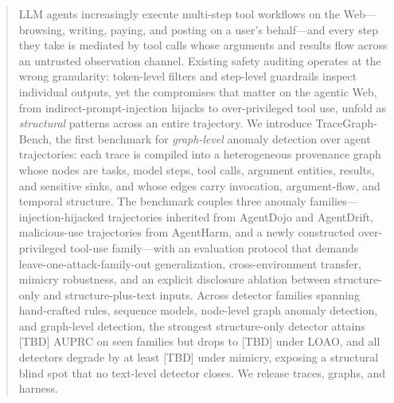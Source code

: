 \begin{abstract}
LLM agents increasingly execute multi-step tool workflows on the Web---browsing, writing, paying, and posting on a user's behalf---and every step they take is mediated by tool calls whose arguments and results flow across an untrusted observation channel. Existing safety auditing operates at the wrong granularity: token-level filters and step-level guardrails inspect individual outputs, yet the compromises that matter on the agentic Web, from indirect-prompt-injection hijacks to over-privileged tool use, unfold as \emph{structural} patterns across an entire trajectory. We introduce TraceGraph-Bench, the first benchmark for \emph{graph-level} anomaly detection over agent trajectories: each trace is compiled into a heterogeneous provenance graph whose nodes are tasks, model steps, tool calls, argument entities, results, and sensitive sinks, and whose edges carry invocation, argument-flow, and temporal structure. The benchmark couples three anomaly families---injection-hijacked trajectories inherited from AgentDojo and AgentDrift, malicious-use trajectories from AgentHarm, and a newly constructed over-privileged tool-use family---with an evaluation protocol that demands leave-one-attack-family-out generalization, cross-environment transfer, mimicry robustness, and an explicit disclosure ablation between structure-only and structure-plus-text inputs. Across detector families spanning hand-crafted rules, sequence models, node-level graph anomaly detection, and graph-level detection, the strongest structure-only detector attains [TBD] AUPRC on seen families but drops to [TBD] under LOAO, and all detectors degrade by at least [TBD] under mimicry, exposing a structural blind spot that no text-level detector closes. We release traces, graphs, and harness.
\end{abstract}

